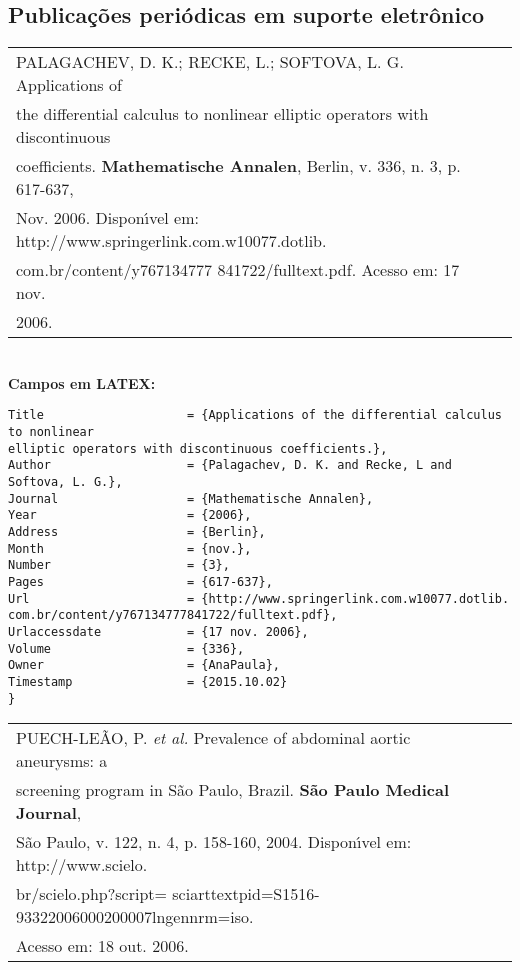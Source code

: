 \subsection{Publica\c{c}\~oes peri\'odicas em suporte eletr\^onico}

\begin{tabular}{|l|c|} \hline
	PALAGACHEV, D. K.; RECKE, L.; SOFTOVA, L. G. Applications of\\ the
	differential calculus to nonlinear elliptic operators with discontinuous\\
	coefficients.  \textbf{Mathematische Annalen}, Berlin, v. 336, n. 3, p. 617-637,
	\\Nov. 2006. Dispon\'{\i}vel em:
	http://www.springerlink.com.w10077.dotlib.\\com.br/content/y767134777
	841722/fulltext.pdf. Acesso em: 17 nov. \\2006. 
	\\\hline
\end{tabular} \\

\textbf{Campos em LATEX:} 

\begin{verbatim}
Title                    = {Applications of the differential calculus 
to nonlinear
elliptic operators with discontinuous coefficients.},
Author                   = {Palagachev, D. K. and Recke, L and 
Softova, L. G.},
Journal                  = {Mathematische Annalen},
Year                     = {2006},
Address                  = {Berlin},
Month                    = {nov.},
Number                   = {3},
Pages                    = {617-637},
Url                      = {http://www.springerlink.com.w10077.dotlib.
com.br/content/y767134777841722/fulltext.pdf},
Urlaccessdate            = {17 nov. 2006},
Volume                   = {336},
Owner                    = {AnaPaula},
Timestamp                = {2015.10.02}
}
\end{verbatim}

\begin{tabular}{|l|c|} \hline
	PUECH-LE\~AO, P. \textit{et al.} Prevalence of abdominal aortic aneurysms: a\\
	screening program in S\~ao Paulo, Brazil. \textbf{S\~ao Paulo Medical Journal},\\
	S\~ao Paulo, v. 122, n. 4, p. 158-160, 2004.  Dispon\'{\i}vel em: http://www.scielo.\\
	br/scielo.php?script= sciarttextpid=S1516-93322006000200007lngennrm=iso. \\
	Acesso em: 18 out. 2006. \\\hline
\end{tabular} \\

